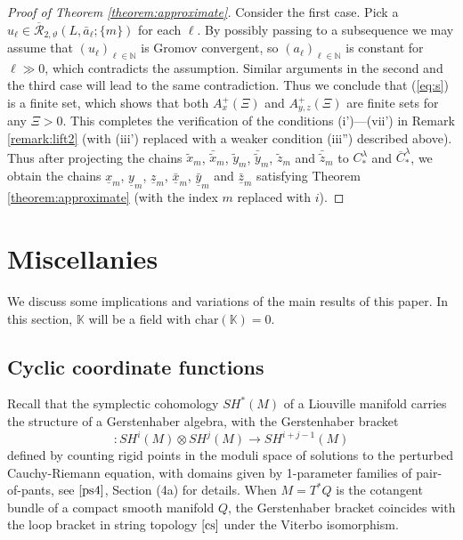 \documentclass[a4paper]{article}
\numberwithin{equation}{section}
\begin{document}
\begin{proof}[Proof of Theorem \ref{theorem:approximate}]
Consider the first case. Pick a $u_\ell\in\overline{\mathcal{R}}_{2,\vartheta}(L,\bar{a}_\ell;\{m\})$ for each $\ell$. By possibly passing to a subsequence we may assume that $(u_\ell)_{\ell\in\mathbb{N}}$ is Gromov convergent, so $(a_\ell)_{\ell\in\mathbb{N}}$ is constant for $\ell\gg0$, which contradicts the assumption. Similar arguments in the second and the third case will lead to the same contradiction. Thus we conclude that (\ref{eq:s}) is a finite set, which shows that both $A_x^+(\Xi)$ and $A_{y,z}^+(\Xi)$ are finite sets for any $\Xi>0$. This completes the verification of the conditions (i')---(vii') in Remark \ref{remark:lift2} (with (iii') replaced with a weaker condition (iii'') described above). Thus after projecting the chains $\tilde{x}_m$, $\bar{\tilde{x}}_m$, $\tilde{y}_m$, $\bar{\tilde{y}}_m$, $\tilde{z}_m$ and $\bar{\tilde{z}}_m$ to $C_\ast^\lambda$ and $\overline{C}_\ast^\lambda$, we obtain the chains $\underline{x}_m$, $\underline{y}_m$, $\underline{z}_m$, $\bar{\underline{x}}_m$, $\bar{\underline{y}}_m$ and $\bar{\underline{z}}_m$ satisfying Theorem \ref{theorem:approximate} (with the index $m$ replaced with $i$).
\end{proof}

\section{Miscellanies}\label{section:mix}

We discuss some implications and variations of the main results of this paper. In this section, $\mathbb{K}$ will be a field with $\mathrm{char}(\mathbb{K})=0$.

\subsection{Cyclic coordinate functions}\label{section:coordinate}

Recall that the symplectic cohomology $\mathit{SH}^\ast(M)$ of a Liouville manifold carries the structure of a Gerstenhaber algebra, with the Gerstenhaber bracket
\begin{equation}
[\cdot,\cdot]:\mathit{SH}^i(M)\otimes\mathit{SH}^j(M)\rightarrow\mathit{SH}^{i+j-1}(M)
\end{equation}
defined by counting rigid points in the moduli space of solutions to the perturbed Cauchy-Riemann equation, with domains given by 1-parameter families of pair-of-pants, see $\cite{ps4}$, Section (4a) for details. When $M=T^\ast Q$ is the cotangent bundle of a compact smooth manifold $Q$, the Gerstenhaber bracket coincides with the loop bracket in string topology $\cite{cs}$ under the Viterbo isomorphism.
\end{document}
